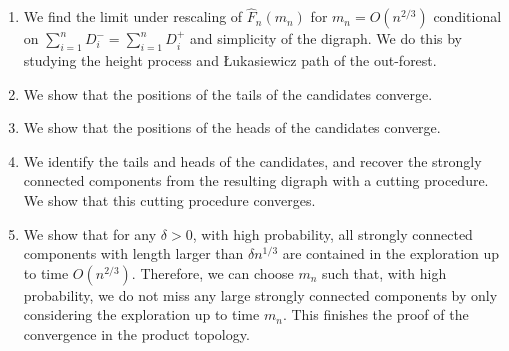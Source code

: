 \begin{enumerate}
    \item We find the limit under rescaling of $\hat{F}_n(m_n)$ for $m_n=O(n^{2/3})$ conditional on $\sum_{i=1}^n D^-_i=\sum_{i=1}^n D^+_i$ and simplicity of the digraph. We do this by studying the height process and \L ukasiewicz path of the out-forest.
    \item We show that the positions of the tails of the candidates converge.
    \item We show that the positions of the heads of the candidates converge.
    \item We identify the tails and heads of the candidates, and recover the strongly connected components from the resulting digraph with a cutting procedure. We show that this cutting procedure converges.
    \item We show that for any $\delta>0$, with high probability, all strongly connected components with length larger than $\delta n^{1/3}$ are contained in the exploration up to time $O(n^{2/3})$. Therefore, we can choose $m_n$ such that, with high probability, we do not miss any large strongly connected components by only considering the exploration up to time $m_n$. This finishes the proof of the convergence in the product topology.
\end{enumerate}

